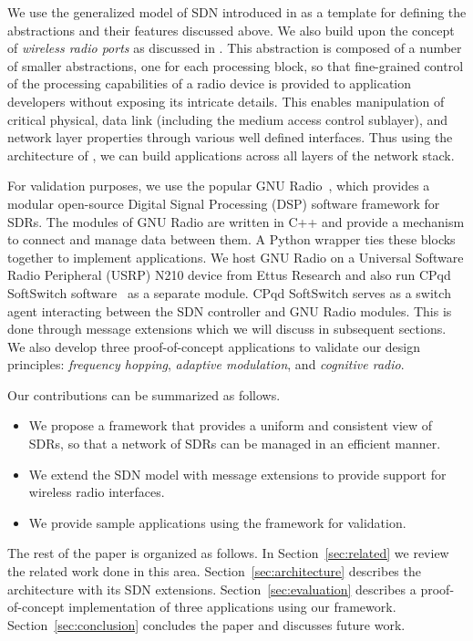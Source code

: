 We use the generalized model of SDN introduced in \cite{Casey:14} as a template for defining the abstractions and their features discussed above. We also build upon the concept of \emph{wireless radio ports} as discussed in \cite{aetherflow}. This abstraction is composed of a number of smaller abstractions, one for each processing block, so that fine-grained control of the processing capabilities of a radio device is provided to application developers without exposing its intricate details. This enables manipulation of critical physical, data link (including the medium access control sublayer), and network layer properties through various well defined interfaces. Thus using the architecture of \crossflow, we can build applications across all layers of the network stack.

For validation purposes, we use the popular GNU Radio~\cite{gnuradio}, which provides a modular  open-source Digital Signal Processing (DSP) software framework for SDRs. The modules of GNU Radio are written in C++ and provide a mechanism to connect and manage data between them. A Python wrapper ties these blocks together to implement applications. We host GNU Radio on a Universal Software Radio Peripheral (USRP) N210 device from Ettus Research and also run CPqd SoftSwitch software~\cite{ofsoftswitch13} as a separate module. CPqd SoftSwitch serves as a switch agent interacting between the SDN controller and GNU Radio modules. This is done through message extensions which we will discuss in subsequent sections. We also develop three proof-of-concept applications to validate our design principles: \emph{frequency hopping}, \emph{adaptive modulation}, and \emph{cognitive radio}.

Our contributions can be summarized as follows.

\begin{itemize}
\item We propose a framework that provides a uniform and consistent view of SDRs, so that a network of SDRs can be managed in an efficient manner.

\item We extend the SDN model with message extensions to provide support for wireless radio interfaces.

\item We provide sample applications using the framework for validation.
\end{itemize}

The rest of the paper is organized as follows. In Section~\ref{sec:related} we review the related work done in this area. Section~\ref{sec:architecture} describes the \crossflow architecture with its SDN extensions. Section~\ref{sec:evaluation} describes a proof-of-concept implementation of three applications using our framework. Section~\ref{sec:conclusion} concludes the paper and discusses future work.
